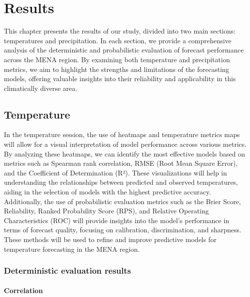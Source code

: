\chapter{Results}
This chapter presents the results of our study, divided into two main sections: temperatures and precipitation. In each section, we provide a comprehensive analysis of the deterministic and probabilistic evaluation of forecast performance across the MENA region. By examining both temperature and precipitation metrics, we aim to highlight the strengths and limitations of the forecasting models, offering valuable insights into their reliability and applicability in this climatically diverse area.
\section{Temperature}

In the temperature session, the use of heatmaps and temperature metrics maps will allow for a visual interpretation of model performance across various metrics. By analyzing these heatmaps, we can identify the most effective models based on metrics such as Spearman rank correlation, RMSE (Root Mean Square Error), and the Coefficient of Determination (R²). These visualizations will help in understanding the relationships between predicted and observed temperatures, aiding in the selection of models with the highest predictive accuracy. Additionally, the use of probabilistic evaluation metrics such as the Brier Score, Reliability, Ranked Probability Score (RPS), and Relative Operating Characteristics (ROC) will provide insights into the model's performance in terms of forecast quality, focusing on calibration, discrimination, and sharpness. These methods will be used to refine and improve predictive models for temperature forecasting in the MENA region.
\subsection{Deterministic evaluation results}
\subsubsection{Correlation}

